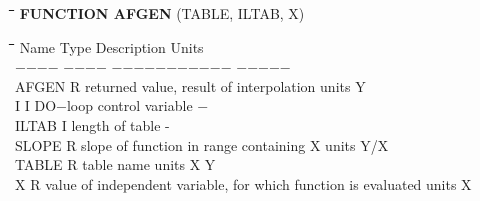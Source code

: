 \documentclass[11pt]{article}
\begin{document}
\bigskip
\nwln
\begin{tabbing}
\hspace{1.27cm}\=\hspace{1.27cm}\=\hspace{1.27cm}\=\hspace{1.27cm}\=%
\hspace{1.27cm}\=\hspace{1.27cm}\=\hspace{1.27cm}\=\hspace{1.27cm}\=%
\hspace{1.27cm}\=\hspace{1.27cm}\=\kill
{\bf FUNCTION AFGEN} \> \> \> (TABLE, ILTAB, X)
\end{tabbing}
\nwln
\begin{tabbing}
\hspace{1.27cm}\=\hspace{1.27cm}\=\hspace{1.27cm}\=\hspace{1.27cm}\=%
\hspace{1.27cm}\=\hspace{1.27cm}\=\hspace{1.27cm}\=\hspace{1.27cm}\=%
\hspace{1.27cm}\=\hspace{1.27cm}\=\kill
Name    \> \> Type   \> Description                                        \> \> \> \> \> \> \> Units\\
$-$$-$$-$$-$    \> \> $-$$-$$-$$-$   \> $-$$-$$-$$-$$-$$-$$-$$-$$-$$-$$-$                                        \> \> \> \> \> \> \> $-$$-$$-$$-$$-$\\
AFGEN   \> \> R   \> returned value, result of interpolation            \> \> \> \> \> \> \> units Y\\
I       \> \> I   \> DO$-$loop control variable                           \> \> \> \> \> \> \> $-$\\
ILTAB\> \> I\> length of table\> \> \> \> \> \> \> -\\
SLOPE   \> \> R   \> slope of function in range containing X            \> \> \> \> \> \> \> units Y/X\\
TABLE   \> \> R   \> table name\> \> \> \> \> \> \> units X Y\\
X       \> \> R   \> value of independent variable, for which function is evaluated\> \> \> \> \> \> \> units X
\end{tabbing}
\end{document}
